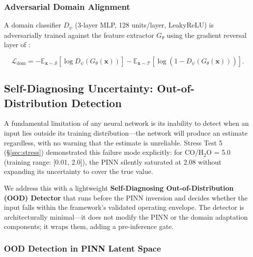 \documentclass[usenatbib]{mnras}
\begin{document}
\subsubsection{Adversarial Domain Alignment}

A domain classifier $D_\psi$ (3-layer MLP, 128 units/layer, LeakyReLU) is adversarially trained against the feature extractor $G_\theta$ using the gradient reversal layer of \citet{ganin16}:

\begin{equation}\label{eq:adv_loss}
\mathcal{L}_{\text{dom}} = -\mathbb{E}_{\mathbf{x}\sim\mathcal{S}}[\log D_\psi(G_\theta(\mathbf{x}))] - \mathbb{E}_{\mathbf{x}\sim\mathcal{T}}[\log(1 - D_\psi(G_\theta(\mathbf{x})))].
\end{equation}

\subsection{Self-Diagnosing Uncertainty: Out-of-Distribution Detection}\label{sec:ood}

A fundamental limitation of any neural network is its inability to detect when an input lies outside its training distribution---the network will produce an estimate regardless, with no warning that the estimate is unreliable. Stress Test 5 (\S\ref{sec:stress}) demonstrated this failure mode explicitly: for CO/H$_2$O = 5.0 (training range: [0.01, 2.0]), the PINN silently saturated at 2.08 without expanding its uncertainty to cover the true value.

We address this with a lightweight \textbf{Self-Diagnosing Out-of-Distribution (OOD) Detector} that runs before the PINN inversion and decides whether the input falls within the framework's validated operating envelope. The detector is architecturally minimal---it does not modify the PINN or the domain adaptation components; it wraps them, adding a pre-inference gate.

\subsubsection{OOD Detection in PINN Latent Space}
\end{document}
